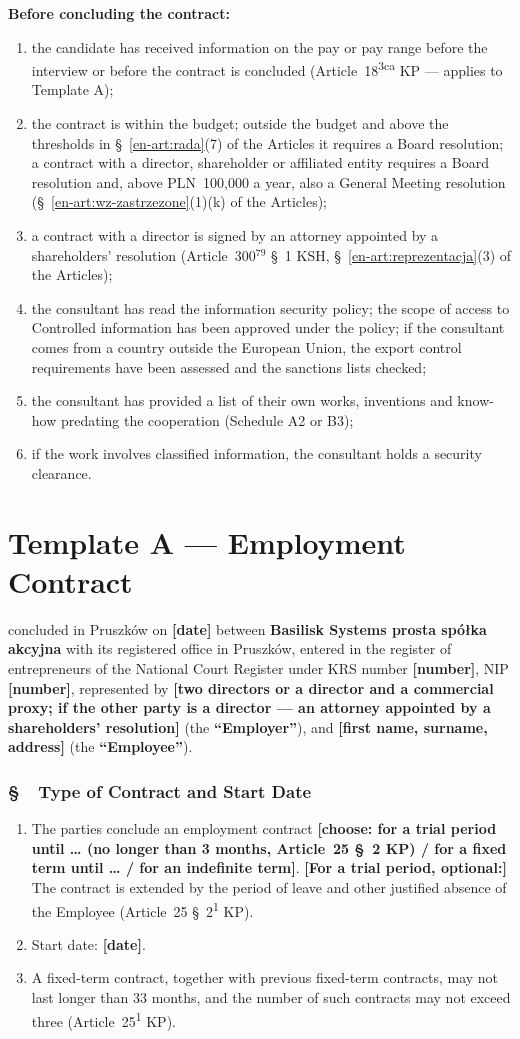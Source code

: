 \documentclass[11pt,a4paper]{report}
\newcounter{paragraf}
\newcommand{\paragraf}[1]{%
  \refstepcounter{paragraf}%
  \Needspace{5\baselineskip}%
  \subsection*{\S~\theparagraf\ #1}%
}
\newenvironment{ContractClause}[1]{\paragraf{#1}}{\par}
\newcommand{\field}[1]{\textbf{[#1]}}
\newcommand{\CompanyFull}{Basilisk Systems prosta spółka akcyjna}
\newcommand{\US}[1]{\S~#1 of the Articles}
\newcommand{\Strony}{\textbf{\CompanyFull{}} with its registered office in Pruszków, entered in the register of entrepreneurs of the National Court Register under KRS number \field{number}, NIP \field{number}, represented by \field{two directors or a director and a commercial proxy; if the other party is a director --- an attorney appointed by a shareholders' resolution}}
\begin{document}
\textbf{Before concluding the contract:}
\begin{enumerate}
  \item the candidate has received information on the pay or pay range before the interview or before the contract is concluded (Article~18\textsuperscript{3ca} KP --- applies to Template A);
  \item the contract is within the budget; outside the budget and above the thresholds in \US{\ref{en-art:rada}(7)} it requires a Board resolution; a contract with a director, shareholder or affiliated entity requires a Board resolution and, above PLN~100,000 a year, also a General Meeting resolution (\US{\ref{en-art:wz-zastrzezone}(1)(k)});
  \item a contract with a director is signed by an attorney appointed by a shareholders' resolution (Article~300$^{79}$ \S~1 KSH, \US{\ref{en-art:reprezentacja}(3)});
  \item the consultant has read the information security policy; the scope of access to Controlled information has been approved under the policy; if the consultant comes from a country outside the European Union, the export control requirements have been assessed and the sanctions lists checked;
  \item the consultant has provided a list of their own works, inventions and know-how predating the cooperation (Schedule A2 or B3);
  \item if the work involves classified information, the consultant holds a security clearance.
\end{enumerate}

\chapter*{Template A --- Employment Contract}
\setcounter{paragraf}{0}

concluded in Pruszków on \field{date} between \Strony{} (the \textbf{``Employer''}), and \field{first name, surname, address} (the \textbf{``Employee''}).

\begin{ContractClause}{Type of Contract and Start Date}
\begin{enumerate}
  \item The parties conclude an employment contract \field{choose: for a trial period until \ldots{} (no longer than 3 months, Article~25 \S~2 KP) / for a fixed term until \ldots{} / for an indefinite term}. \field{For a trial period, optional:} The contract is extended by the period of leave and other justified absence of the Employee (Article~25 \S~2\textsuperscript{1} KP).
  \item Start date: \field{date}.
  \item A fixed-term contract, together with previous fixed-term contracts, may not last longer than 33 months, and the number of such contracts may not exceed three (Article~25\textsuperscript{1} KP).
\end{enumerate}
\end{ContractClause}
\end{document}
